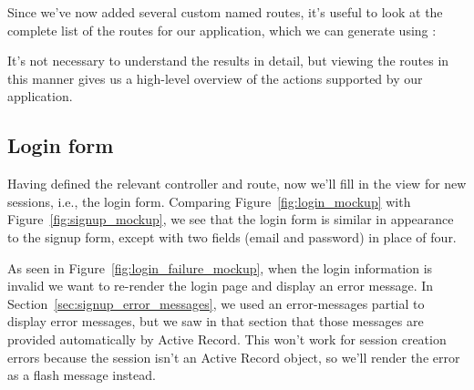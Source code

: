Since we've now added several custom named routes, it's useful to look at the complete list of the routes for our application, which we can generate using :


\noindent It's not necessary to understand the results in detail, but viewing the routes in this manner gives us a high-level overview of the actions supported by our application.


  \subsection{Login form} %
  \label{sec:login_form}

Having defined the relevant controller and route, now we'll fill in the view for new sessions, i.e., the login form. Comparing Figure~\ref{fig:login_mockup} with Figure~\ref{fig:signup_mockup}, we see that the login form is similar in appearance to the signup form, except with two fields (email and password) in place of four.

As seen in Figure~\ref{fig:login_failure_mockup}, when the login information is invalid we want to re-render the login page and display an error message. In Section~\ref{sec:signup_error_messages}, we used an error-messages partial to display error messages, but we saw in that section that those messages are provided automatically by Active Record. This won't work for session creation errors because the session isn't an Active Record object, so we'll render the error as a flash message instead.

